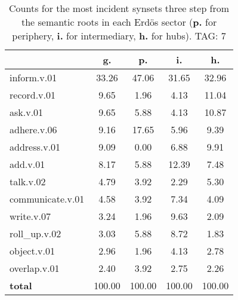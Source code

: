 \begin{table}[h!]
\begin{center}
\begin{tabular}{| l || c | c | c | c |}\hline
 & {\bf g.} & {\bf p.} & {\bf i.} & {\bf h.} \\\hline\hline
inform.v.01 & 33.26  & 47.06  & 31.65  & 32.96 \\\hline
record.v.01 & 9.65  & 1.96  & 4.13  & 11.04 \\\hline
ask.v.01 & 9.65  & 5.88  & 4.13  & 10.87 \\\hline
adhere.v.06 & 9.16  & 17.65  & 5.96  & 9.39 \\\hline
address.v.01 & 9.09  & 0.00  & 6.88  & 9.91 \\\hline
add.v.01 & 8.17  & 5.88  & 12.39  & 7.48 \\\hline
talk.v.02 & 4.79  & 3.92  & 2.29  & 5.30 \\\hline
communicate.v.01 & 4.58  & 3.92  & 7.34  & 4.09 \\\hline
write.v.07 & 3.24  & 1.96  & 9.63  & 2.09 \\\hline
roll\_up.v.02 & 3.03  & 5.88  & 8.72  & 1.83 \\\hline
object.v.01 & 2.96  & 1.96  & 4.13  & 2.78 \\\hline
overlap.v.01 & 2.40  & 3.92  & 2.75  & 2.26 \\\hline\hline
{{\bf total}} & 100.00  & 100.00  & 100.00  & 100.00 \\\hline
\end{tabular}
\caption{Counts for the most incident synsets three step from the semantic roots in each Erd\"os sector ({\bf p.} for periphery, {\bf i.} for intermediary, {\bf h.} for hubs). TAG: 7}
\end{center}
\end{table}